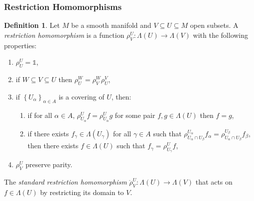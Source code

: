 \documentclass{article}
\theoremstyle{definition}
\newtheorem{definition}{Definition}
\begin{document}
\subsubsection{Restriction Homomorphisms}

\begin{definition}
    \label{def:restriction_homomorphism}
    Let $M$ be a smooth manifold and $V \subseteq U \subseteq M$ open subsets. A \emph{restriction homomorphism} is a function $\rho_V^U: \Lambda(U) \rightarrow \Lambda(V)$ with the following properties:
    \begin{enumerate}
        \item $\rho_U^U = \mathds{1}$,
        \item if $W \subseteq V \subseteq U$ then $\rho_U^W = \rho_V^W \rho_U^V$,
        \item if $\left\{ U_\alpha \right\}_{\alpha \in A}$ is a covering of $U$, then:
        \begin{enumerate}
            \item if for all $\alpha \in A$, $\rho_{U_\alpha}^U f = \rho_{U_\alpha}^U g$ for some pair $f, g \in \Lambda(U)$ then $f = g$,
            \item if there exists $f_\gamma \in \Lambda(U_\gamma)$ for all $\gamma \in A$ such that $\rho_{U_\alpha \cap U_\beta}^{U_\alpha} f_\alpha = \rho_{U_\alpha \cap U_\beta}^{U_\beta} f_\beta$, then there exists $f \in \Lambda(U)$ such that $f_\gamma = \rho_{U_\gamma}^U f$,
        \end{enumerate}
        \item $\rho_V^U$ preserve parity.
    \end{enumerate}
    The \emph{standard restriction homomorphism} $\mathring{\rho}_V^U: \Lambda(U) \rightarrow \Lambda(V)$ that acts on $f \in \Lambda(U)$ by  restricting its domain to $V$.
\end{definition}
\end{document}
